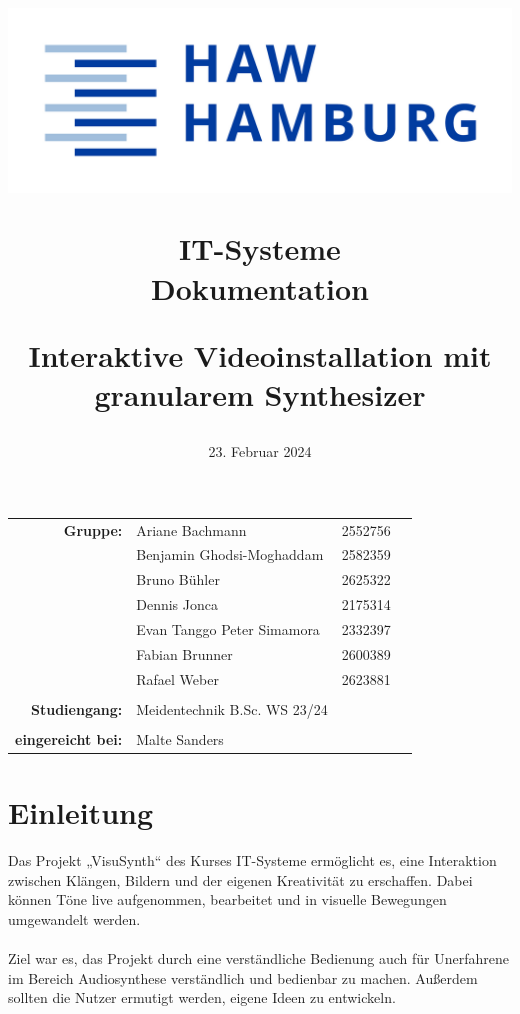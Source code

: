 \documentclass[12pt]{scrartcl}%
\title{
\begin{flushright}
 \includegraphics[scale=0.5]{HAW_Marke_RGB_300dpi.jpg}
\end{flushright}

\vspace{2cm}

IT-Systeme\\
Dokumentation
 
\vspace{1cm}

\LARGE Interaktive Videoinstallation mit\\
granularem Synthesizer
}
\date{23. Februar 2024}
\theoremstyle{nonumberplain}
\begin{document}
\begin{titlepage}


\maketitle %


\vfill 

\begin{flushleft}
\begin{tabular}{rlll}
\textbf{Gruppe:} & Ariane Bachmann & 2552756 & \hspace{5cm} \\
 & Benjamin Ghodsi-Moghaddam & 2582359 & \hspace{5cm} \\
 & Bruno Bühler & 2625322 & \hspace{5cm} \\
  & Dennis Jonca & 2175314 & \hspace{5cm} \\
   & Evan Tanggo Peter Simamora & 2332397 & \hspace{5cm} \\
    & Fabian Brunner &  2600389 & \hspace{5cm} \\
& Rafael Weber & 2623881 & \hspace{5cm} \\\\
\textbf{Studiengang:} & Meidentechnik B.Sc. WS 23/24 & \hspace{5cm} \\\\
\textbf{eingereicht bei:} & Malte Sanders & \hspace{5cm} \\ 
\end{tabular}
\end{flushleft}

\end{titlepage}

\tableofcontents

\newpage

\section{Einleitung}

Das Projekt „VisuSynth“ des Kurses IT-Systeme ermöglicht es, eine Interaktion zwischen
Klängen, Bildern und der eigenen Kreativität zu erschaffen. Dabei können Töne live aufgenommen, bearbeitet und in visuelle Bewegungen umgewandelt werden.
\\\\
Ziel war es, das Projekt durch eine verständliche Bedienung auch für Unerfahrene im Bereich Audiosynthese verständlich und bedienbar zu machen. Außerdem sollten die Nutzer ermutigt werden, eigene Ideen zu entwickeln.
\end{document}
